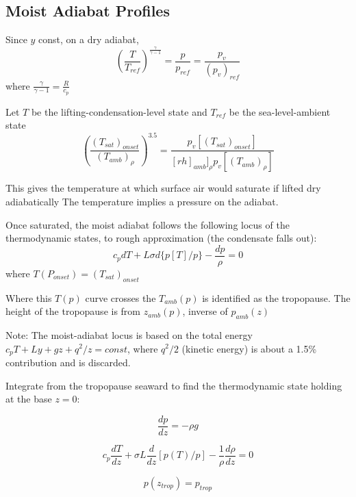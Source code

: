 \documentclass{article}
\begin{document}
\subsection{Moist Adiabat Profiles}

Since $y$ const, on a dry adiabat,   
\begin{equation}
	\left ( \frac{T}{T_{ref}} \right ) ^\frac{\gamma}{\gamma-1} = \frac{p}{p_{ref}} = \frac{p_v}{(p_v)_{ref}}
\end{equation}
where $\frac{\gamma}{\gamma-1} = \frac{R}{c_p}$

Let $T$ be the lifting-condensation-level state and $T_{ref}$ be the sea-level-ambient state
\begin{equation}
	\left ( \frac{ (T_{sat} )_{onset}  }{ (T_{amb})_{\rho} } \right ) ^{3.5} = \frac{ p_v[ (T_{sat})_{onset}]   }{[rh]_{amb}]_\rho p_v[(T_{amb})_\rho]}
\end{equation}


This gives the temperature at which surface air would saturate if lifted dry adiabatically The temperature implies a pressure on the adiabat.

Once saturated, the moist adiabat follows the following locus of the thermodynamic states, to rough approximation (the condensate falls out):
\begin{equation}
	c_p dT + L \sigma d\{ p[T]/p \} - \frac{dp}{\rho} = 0
\end{equation}
where $T(P_{onset} ) = (T_{sat} )_{onset}$

Where this $T(p)$ curve crosses the $T_{amb}(p)$ is identified as the tropopause. The height of the tropopause is from $z_{amb}(p)$, inverse of $p_{amb}(z)$

Note: The moist-adiabat locus is based on the total energy $c_p T + Ly + gz + q^2/z = const$, where $q^2/2$ (kinetic energy) is about a 1.5\% contribution and is discarded.

Integrate from the tropopause seaward to find the thermodynamic state holding at the base $z=0$:

\begin{equation}
	\frac{dp}{dz} = - \rho g
\end{equation}

\begin{equation}
	c_p \frac{dT}{dz} + \sigma L \frac{d}{dz} [ p(T) / p] - \frac{1}{\rho} \frac{d \rho}{d z} = 0
\end{equation}

\begin{equation}
	p(z_{trop}) = p_{trop} 
\end{equation}
\end{document}
